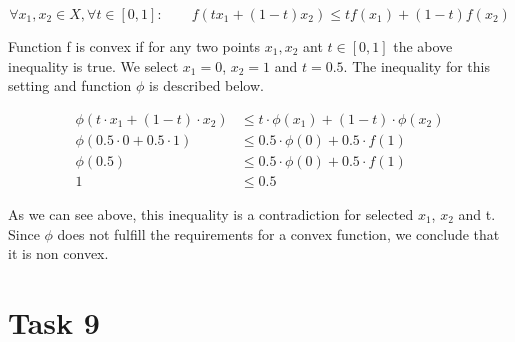 
\begin{equation}
	\forall x_1, x_2 \in X, \forall t \in [0, 1]: \qquad f(tx_1+(1-t)x_2)\leq t f(x_1)+(1-t)f(x_2)
\end{equation}

Function f is convex if for any two points $x_{1}, x_{2}$ ant $t\in[0, 1]$ the above inequality is true. We select $x_{1} = 0$, $x_{2} = 1$ and $t=0.5$. The inequality for this setting and function $\phi$ is described below.

\begin{equation}
\begin{split}
	\phi(t \cdot x_1+(1-t) \cdot x_2) &\leq t \cdot \phi(x_1)+(1-t) \cdot \phi(x_2)\\
	\phi(0.5 \cdot 0 + 0.5 \cdot 1) &\leq 0.5 \cdot \phi(0) + 0.5 \cdot f(1)\\
	\phi(0.5) &\leq 0.5 \cdot \phi(0) + 0.5 \cdot f(1)\\
	1 &\leq 0.5
\end{split}
\end{equation}

As we can see above, this inequality is a contradiction for selected $x_{1}$, $x_{2}$ and t. Since $\phi$ does not fulfill the requirements for a convex function, we conclude that it is non convex.

\section {Task 9}

